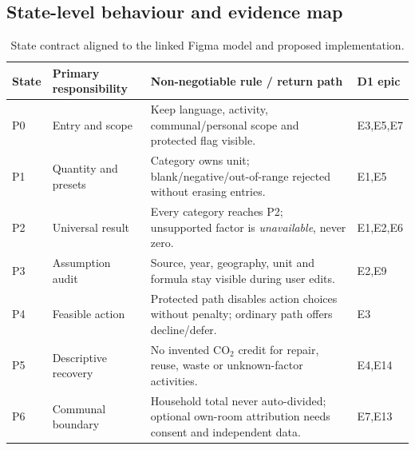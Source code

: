 \documentclass[12pt,a4paper]{article}
\begin{document}
\subsection{State-level behaviour and evidence map}
\begin{table}[ht]
\centering\small
\caption{State contract aligned to the linked Figma model and proposed implementation.}
\label{tab:state-contract}
\begin{tabularx}{\textwidth}{@{}p{1.2cm}p{2.5cm}Xp{1.9cm}@{}}
\toprule
\textbf{State}&\textbf{Primary responsibility}&\textbf{Non-negotiable rule / return path}&\textbf{D1 epic}\\
\midrule
P0&Entry and scope&Keep language, activity, communal/personal scope and protected flag visible.&E3,E5,E7\\
P1&Quantity and presets&Category owns unit; blank/negative/out-of-range rejected without erasing entries.&E1,E5\\
P2&Universal result&Every category reaches P2; unsupported factor is \emph{unavailable}, never zero.&E1,E2,E6\\
P3&Assumption audit&Source, year, geography, unit and formula stay visible during user edits.&E2,E9\\
P4&Feasible action&Protected path disables action choices without penalty; ordinary path offers decline/defer.&E3\\
P5&Descriptive recovery&No invented CO$_2$ credit for repair, reuse, waste or unknown-factor activities.&E4,E14\\
P6&Communal boundary&Household total never auto-divided; optional own-room attribution needs consent and independent data.&E7,E13\\
\bottomrule
\end{tabularx}
\end{table}
\end{document}
